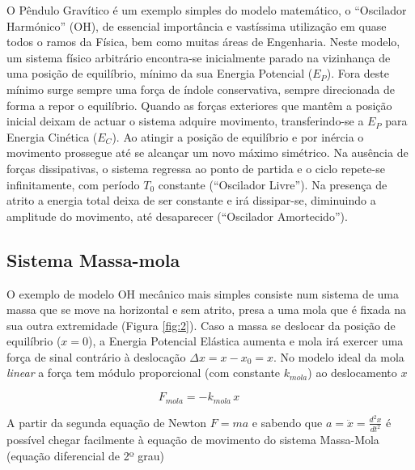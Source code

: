 \documentclass[a4paper,twoside,12pt]{article}      %
\begin{document}
O Pêndulo Gravítico é um exemplo simples do modelo  matemático, o ``Oscilador Harmónico'' (OH), de essencial importância e  vastíssima utilização em quase todos o ramos da Física, bem como muitas áreas de Engenharia. Neste modelo, um sistema físico arbitrário encontra-se inicialmente parado na vizinhança de uma posição de equilíbrio, mínimo da sua Energia Potencial  ($E_P$). Fora deste mínimo surge sempre uma força de índole conservativa, sempre direcionada de forma a repor o equilíbrio. 
Quando as forças exteriores que mantêm a posição inicial deixam de actuar o sistema adquire movimento, 
transferindo-se a $E_P$ para Energia Cinética ($E_C$). 
Ao atingir a posição de equilíbrio e por inércia o movimento prossegue até se alcançar um novo máximo simétrico. Na ausência de forças dissipativas, o sistema regressa  ao ponto de partida e o ciclo repete-se infinitamente, com período $T_0$ constante (``Oscilador Livre''). Na presença de atrito a energia total deixa de ser constante e irá dissipar-se, diminuindo a amplitude do movimento, até desaparecer (``Oscilador Amortecido'').

\subsection{\sf Sistema Massa-mola}
O exemplo de modelo OH mecânico mais simples  consiste num sistema de uma massa que se move na horizontal e sem atrito,  presa a uma mola  que é fixada na sua outra extremidade (Figura \ref{fig:2}). Caso a massa se deslocar da posição de equilíbrio ($x =0$), a Energia Potencial Elástica aumenta e mola irá exercer uma força de sinal contrário à deslocação $\Delta x = x - x_0 = x$. No modelo ideal da mola \emph{linear}  a força tem  módulo proporcional (com constante $k_{mola}$) ao deslocamento $x$ 

\begin{equation}
F_{mola} = - k_{mola} \, x \qquad 
\end{equation}

A partir da segunda equação de Newton $F=m a$ e sabendo que $ a = \ddot{x}= \frac{d^2 x}{dt^2}$ é possível chegar facilmente  à equação de movimento do sistema Massa-Mola (equação diferencial de 2º grau)
\end{document}
